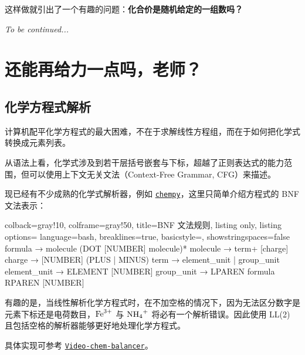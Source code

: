 \documentclass{ctexart}
\begin{document}
这样做就引出了一个有趣的问题：\textbf{化合价是随机给定的一组数吗？}

\textit{To be continued...}

\section{还能再给力一点吗，老师？}
\subsection{化学方程式解析}

计算机配平化学方程式的最大困难，不在于求解线性方程组，而在于如何把化学式转换成元素列表。

从语法上看，化学式涉及到若干层括号嵌套与下标，超越了正则表达式的能力范围，但可以使用上下文无关文法（Context-Free Grammar, CFG）来描述。

\vspace{0.5em}

现已经有不少成熟的化学式解析器，例如
\href{https://github.com/bjodah/chempy}{\texttt{chempy}}，这里只简单介绍方程式的 BNF 文法表示：

\begin{tcblisting}{
        colback=gray!10,
        colframe=gray!50,
        title=BNF 文法规则,
        listing only,
        listing options={
            language=bash,
            breaklines=true,
            basicstyle=\ttfamily\small,
            showstringspaces=false
        }
    }
    formula      → molecule (DOT [NUMBER] molecule)*
    molecule     → term+ [charge]
    charge       → [NUMBER] (PLUS | MINUS)
    term         → element_unit | group_unit
    element_unit → ELEMENT [NUMBER]
    group_unit   → LPAREN formula RPAREN [NUMBER]
\end{tcblisting}

\vspace{0.5em}

有趣的是，当线性解析化学方程式时，在不加空格的情况下，因为无法区分数字是元素下标还是电荷数目，$\ce{Fe^3+}$ 与
$\ce{NH4+}$ 将必有一个解析错误。因此使用 LL(2) 且包括空格的解析器能够更好地处理化学方程式。

具体实现可参考
\href{https://github.com/Sazzzzzz/Video-chem-balancer}{\texttt{Video-chem-balancer}}。
\printbibliography[heading=bibintoc,title={参考文献}]
\end{document}
